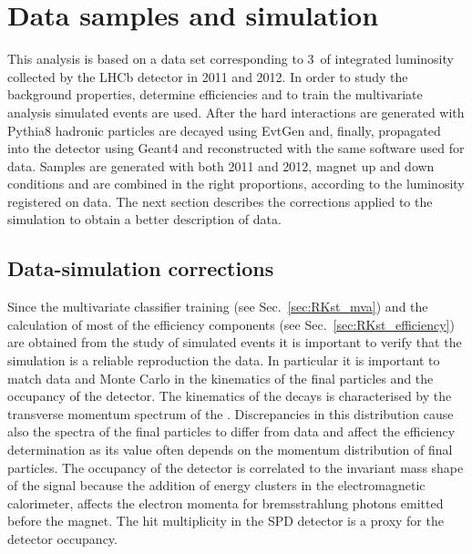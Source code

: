 \section{Data samples and simulation}

This analysis is based on a data set corresponding to 3~\invfb of integrated
luminosity collected by the LHCb detector in 2011 and 2012.
In order to study the background properties, determine efficiencies and to train the multivariate analysis
simulated events are used. After the hard interactions are generated with Pythia8 hadronic particles
are decayed using EvtGen and, finally, propagated into the detector using Geant4 and reconstructed
with the same software used for data. Samples are generated with both 2011 and 2012, magnet up and down
 conditions and are combined in the right proportions, according to the luminosity registered on data.
The next section describes the corrections applied to the simulation to obtain a better description of data.


\subsection{Data-simulation corrections}
\label{sec:RKst_mc_weighting}

Since the multivariate classifier training (see Sec.~\ref{sec:RKst_mva}) and the calculation
of most of the efficiency components (see Sec.~\ref{sec:RKst_efficiency}) are obtained from
the study of simulated events it is important to verify that the simulation is a reliable
reproduction the data. In particular it is important to match data and Monte Carlo
in the kinematics of the final particles and the occupancy of the detector.
The kinematics of the decays is characterised by the transverse momentum spectrum of
the \Bz. Discrepancies in this distribution cause also the spectra of the final particles
to differ from data and affect the efficiency determination as its value often
depends on the momentum distribution of final particles.
The occupancy of the detector is correlated to the invariant mass shape of the signal because
the addition of energy clusters in the electromagnetic calorimeter,
affects the electron momenta for bremsstrahlung photons emitted before the magnet.
The hit multiplicity in the SPD detector is a proxy for the detector occupancy.

